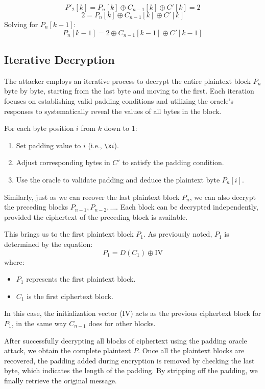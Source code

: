 \documentclass[conference]{IEEEtran}
\begin{document}
\[
P'_2[k] = P_n[k] \oplus C_{n-1}[k] \oplus C'[k] = 2
\]
\[
2 = P_n[k] \oplus C_{n-1}[k] \oplus C'[k]
\]
Solving for \(P_n[k-1]\):
\[
P_n[k-1] = 2 \oplus C_{n-1}[k-1] \oplus C'[k-1]
\]

\subsection{Iterative Decryption}
The attacker employs an iterative process to decrypt the entire plaintext block \(P_n\) byte by byte, starting from the last byte and moving to the first. Each iteration focuses on establishing valid padding conditions and utilizing the oracle's responses to systematically reveal the values of all bytes in the block. 

For each byte position \(i\) from \(k\) down to 1:
    \begin{enumerate}
        \item Set padding value to \(i\) (i.e., \texttt{\textbackslash x$i$}).
        \item Adjust corresponding bytes in \(C'\) to satisfy the padding condition.
        \item Use the oracle to validate padding and deduce the plaintext byte \(P_n[i]\).
    \end{enumerate}

Similarly, just as we can recover the last plaintext block \(P_n\), we can also decrypt the preceding blocks \(P_{n-1}, P_{n-2}, \dots\). Each block can be decrypted independently, provided the ciphertext of the preceding block is available.

This brings us to the first plaintext block \( P_1 \). As previously noted, \( P_1 \) is determined by the equation:
\[
P_1 = D(C_1) \oplus \text{IV}
\]
where:
\begin{itemize}
    \item \( P_1 \) represents the first plaintext block.
    \item \( C_1 \) is the first ciphertext block.
\end{itemize}

In this case, the initialization vector (IV) acts as the previous ciphertext block for \( P_1 \), in the same way \( C_{n-1} \) does for other blocks.

After successfully decrypting all blocks of ciphertext using the padding oracle attack, we obtain the complete plaintext \( P \). Once all the plaintext blocks are recovered, the padding added during encryption is removed by checking the last byte, which indicates the length of the padding. By stripping off the padding, we finally retrieve the original message. 
\end{document}
